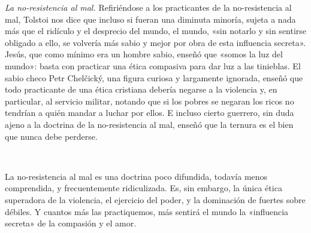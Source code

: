 \documentclass[a4paper, 12pt]{article}
\begin{document}
\textit{La no-resistencia al mal.} Refiriéndose a los practicantes de la
no-resistencia al mal, Tolstoi nos dice que incluso si fueran una diminuta
minoría, sujeta a nada más que el ridículo y el desprecio del mundo, el mundo,
«sin notarlo y sin sentirse obligado a ello, se volvería más sabio y mejor por
obra de esta influencia secreta». Jesús, que como mínimo era un hombre sabio,
enseñó que «somos la luz del mundo»: basta con practicar una ética compasiva
para dar luz a las tinieblas. El sabio checo Petr Chelčický, una figura curiosa
y largamente ignorada, enseñó que todo practicante de una ética cristiana
debería negarse a la violencia y, en particular, al servicio militar, notando
que si los pobres se negaran los ricos no tendrían a quién mandar a luchar por
ellos. E incluso cierto guerrero, sin duda ajeno a la doctrina de la
no-resistencia al mal, enseñó que la ternura es el bien que nunca debe perderse. 

~

La no-resistencia al mal es una doctrina poco difundida, todavía menos
comprendida, y frecuentemente ridiculizada. Es, sin embargo, la única ética
superadora de la violencia, el ejercicio del poder, y la dominación de fuertes
sobre débiles. Y cuantos más las practiquemos, más sentirá el mundo la
«influencia secreta» de la compasión y el amor.
\end{document}
